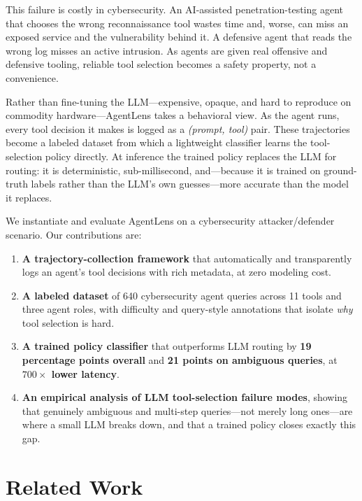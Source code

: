 \documentclass[conference]{IEEEtran}
\begin{document}
This failure is costly in cybersecurity. An AI-assisted penetration-testing
agent that chooses the wrong reconnaissance tool wastes time and, worse, can
miss an exposed service and the vulnerability behind it. A defensive agent that
reads the wrong log misses an active intrusion. As agents are given real
offensive and defensive tooling, reliable tool selection becomes a safety
property, not a convenience.

Rather than fine-tuning the LLM---expensive, opaque, and hard to reproduce on
commodity hardware---AgentLens takes a behavioral view. As the agent runs, every
tool decision it makes is logged as a \emph{(prompt, tool)} pair. These
trajectories become a labeled dataset from which a lightweight classifier learns
the tool-selection policy directly. At inference the trained policy replaces the
LLM for routing: it is deterministic, sub-millisecond, and---because it is
trained on ground-truth labels rather than the LLM's own guesses---more accurate
than the model it replaces.

We instantiate and evaluate AgentLens on a cybersecurity attacker/defender
scenario. Our contributions are:

\begin{enumerate}
\item \textbf{A trajectory-collection framework} that automatically and
transparently logs an agent's tool decisions with rich metadata, at zero
modeling cost.
\item \textbf{A labeled dataset} of 640 cybersecurity agent queries across 11
tools and three agent roles, with difficulty and query-style annotations that
isolate \emph{why} tool selection is hard.
\item \textbf{A trained policy classifier} that outperforms LLM routing by
\textbf{19 percentage points overall} and \textbf{21 points on ambiguous
queries}, at \textbf{$700\times$ lower latency}.
\item \textbf{An empirical analysis of LLM tool-selection failure modes},
showing that genuinely ambiguous and multi-step queries---not merely long
ones---are where a small LLM breaks down, and that a trained policy closes
exactly this gap.
\end{enumerate}

\section{Related Work}
\end{document}

